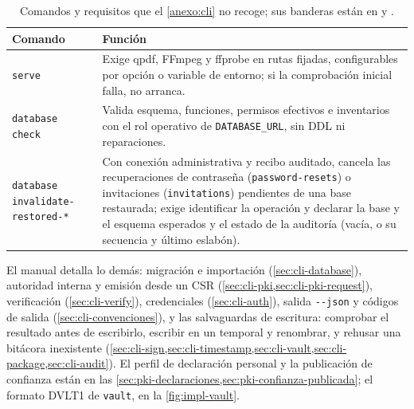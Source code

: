 \begin{table}[!tb]
  \centering
  \caption[Operaciones de \texttt{despacho-cli} ausentes del manual.]{Comandos y requisitos que el \cref{anexo:cli} no recoge; sus banderas están en  y .}
  \label{tab:impl-cli-catalogo}
  
  \shorthandoff{<>}%
  \begin{tabularx}{\linewidth}{@{}L{3.2cm} X@{}}
    \toprule
    \textbf{Comando} & \textbf{Función} \\
    \midrule
    \texttt{serve} & Exige qpdf, FFmpeg y \mbox{ffprobe} en rutas fijadas, configurables por opción o variable de entorno; si la comprobación inicial falla, no arranca. \\
    \texttt{database check} & Valida esquema, funciones, permisos efectivos e inventarios con el rol operativo de \texttt{DATABASE\_URL}, sin DDL ni reparaciones. \\
    \texttt{database} \texttt{invalidate-\allowbreak restored-*} & Con conexión administrativa y recibo auditado, cancela las recuperaciones de contraseña (\texttt{password-resets}) o invitaciones (\texttt{invitations}) pendientes de una base restaurada; exige identificar la operación y declarar la base y el esquema esperados y el estado de la auditoría (vacía, o su secuencia y último eslabón). \\
    \bottomrule
  \end{tabularx}
\end{table}

El manual detalla lo demás: migración e importación (\cref{sec:cli-database}), autoridad interna y emisión desde un CSR (\cref{sec:cli-pki,sec:cli-pki-request}), verificación (\cref{sec:cli-verify}), credenciales (\cref{sec:cli-auth}), salida \texttt{-{}-json} y códigos de salida (\cref{sec:cli-convenciones}), y las salvaguardas de escritura: comprobar el resultado antes de escribirlo, escribir en un temporal y renombrar, y rehusar una bitácora inexistente (\cref{sec:cli-sign,sec:cli-timestamp,sec:cli-vault,sec:cli-package,sec:cli-audit}). El perfil de declaración personal y la publicación de confianza están en las \cref{sec:pki-declaraciones,sec:pki-confianza-publicada}; el formato DVLT1 de \texttt{vault}, en la \cref{fig:impl-vault}.

